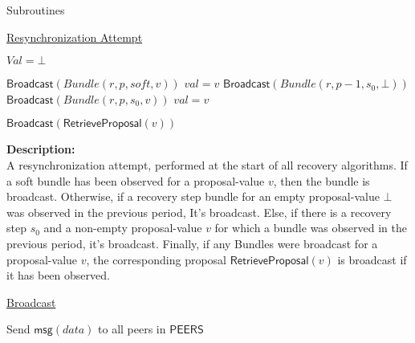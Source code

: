 \documentclass[10pt,a4paper]{article}
\begin{document}
\begin{section}{Subroutines}

\begin{algorithm}[H]
    \caption{\underline{Resynchronization Attempt}}
    \label{algo:resynchronization-attempt}
    \begin{algorithmic}[1]

    \State $Val = \bot$

        \State $\mathsf{Broadcast}(Bundle(r, p, soft, v))$
        \State $val = v$    
        \State $\mathsf{Broadcast}(Bundle(r, p - 1, s_0, \bot))$
        \State $\mathsf{Broadcast}(Bundle(r, p, s_0, v))$
        \State $val = v$
    \EndIf

        \State $\mathsf{Broadcast}(\mathsf{RetrieveProposal}(v))$
    \EndIf

    \EndFunction
    \end{algorithmic}
\end{algorithm}

\noindent \textbf{Description:}\\
A resynchronization attempt, performed at the start of all recovery algorithms.
If a soft bundle has been observed for a proposal-value $v$, then the bundle is broadcast.
Otherwise, if a recovery step bundle for an empty proposal-value $\bot$ was observed in the previous period,
It's broadcast.
Else, if there is a recovery step $s_0$ and a non-empty proposal-value $v$ for which a bundle was observed in the previous
period, it's broadcast.
Finally, if any Bundles were broadcast for a proposal-value $v$, the corresponding proposal $\mathsf{RetrieveProposal}(v)$ is broadcast
if it has been observed.\\


\begin{algorithm}[H]
    \caption{\underline{Broadcast}}
    \label{algo:broadcast}
    \begin{algorithmic}[1]

    Send $\mathsf{msg}(data)$ to all peers in $\mathsf{PEERS}$


\end{algorithmic}
\end{algorithm}
\end{section}
\end{document}
